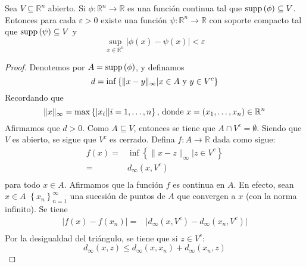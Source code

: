 \documentclass[12pt]{report}
\theoremstyle{largebreak}
\newcommand\abs[1]{\ensuremath{\lvert#1\rvert}}
\newcommand\cf[3]{\ensuremath{#1:#2\rightarrow#3}}
\newcommand\supp[1]{\ensuremath{\textup{supp}\left(#1\right)}}
\begin{document}
\setcounter{section}{5}
\setcounter{theor}{10}

\begin{theor}
    Sea $V\subseteq\mathbb{R}^n$ abierto. Si $\cf{\phi}{\mathbb{R}^n}{\mathbb{R}}$ es una función continua tal que $\supp{\phi}\subseteq V$. Entonces para cada $\varepsilon>0$ existe una función $\cf{\psi}{\mathbb{R}^n}{\mathbb{R}}$ con soporte compacto tal que $\supp{\psi}\subseteq V$ y
    \begin{equation*}
        \sup_{x\in\mathbb{R}^n}\abs{\phi(x)-\psi(x)}<\varepsilon
    \end{equation*}
\end{theor}

\begin{proof}
    Denotemos por $A=\supp{\phi}$, y definamos
    \begin{equation*}
        d=\inf\left\{\|x-y\|_{\infty}|x\in A \textup{ y }y\in V^c\right\}
    \end{equation*}
    Recordando que 
    \begin{equation*}
        \|x\|_{\infty}=\max\left\{\abs{x_i}|i=1,\dots,n\right\}\textup{, donde }x=\left(x_1,\dots,x_n\right)\in\mathbb{R}^n
    \end{equation*}
    Afirmamos que $d>0$. Como $A\subseteq V$, entonces se tiene que $A\cap V^c=\emptyset$. Siendo que $V$ es abierto, se sigue que $V^c$ es cerrado. Defina $\cf{f}{A}{\mathbb{R}}$ dada como sigue:
    \begin{equation*}
        \begin{split}
            f(x)=&\inf\left\{\|x-z\|_{\infty}|z\in V^c\right\}\\
            =&d_\infty(x,V^c)\\
        \end{split}
    \end{equation*}
    para todo $x\in A$. Afirmamos que la función $f$ es continua en $A$. En efecto, sean $x\in A$ $\left\{x_n\right\}_{n=1}^{\infty}$ una sucesión de puntos de $A$ que convergen a $x$ (con la norma infinito). Se tiene
    \begin{equation}
        \begin{split}
            \abs{f(x)-f(x_n)}=&\abs{d_\infty(x,V^c)-d_\infty(x_n,V^c)}\\
        \end{split}
    \end{equation}
    Por la desigualdad del triángulo, se tiene que si $z\in V^c$:
    \begin{equation*}
        d_{\infty}(x,z)\leq d_{\infty}(x,x_n)+d_{\infty}(x_n,z)

\end{equation*}
\end{proof}
\end{document}

